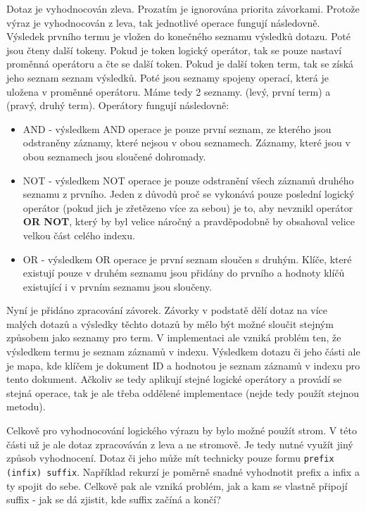 \documentclass[12pt, letterpaper]{article}
\begin{document}
Dotaz je vyhodnocován zleva. Prozatím je ignorována priorita závorkami. Protože výraz je vyhodnocován z leva, tak jednotlivé
operace fungují následovně. Výsledek prvního termu je vložen do konečného seznamu výsledků dotazu. Poté jsou čteny
další tokeny. Pokud je token logický operátor, tak se pouze nastaví proměnná operátoru a čte se další token. Pokud
je další token term, tak se získá jeho seznam seznam výsledků. Poté jsou seznamy spojeny operací, která je uložena
v  proměnné operátoru. Máme tedy 2 seznamy.  (levý, první term) a  (pravý, druhý term).
Operátory fungují následovně:
\begin{itemize}
    \item AND - výsledkem AND operace je pouze první seznam, ze kterého jsou odstraněny záznamy, které nejsou
        v obou seznamech. Záznamy, které jsou v obou seznamech jsou sloučené dohromady.
    \item NOT - výsledkem NOT operace je pouze odstranění všech záznamů druhého seznamu z prvního. Jeden z důvodů proč
        se vykonává pouze poslední logický operátor (pokud jich je zřetězeno více za sebou) je to, aby nevznikl operátor
        \textbf{OR NOT}, který by byl velice náročný a pravděpodobně by obsahoval velice velkou část celého indexu.
    \item OR - výsledkem OR operace je první seznam sloučen s druhým. Klíče, které existují pouze v druhém seznamu
        jsou přidány do prvního a hodnoty klíčů existující i v prvním seznamu jsou sloučeny.
\end{itemize}

Nyní je přidáno zpracování závorek. Závorky v podstatě dělí dotaz na více malých dotazů a výsledky těchto dotazů by mělo
být možné sloučit stejným způsobem jako seznamy pro term. V implementaci ale vzniká problém ten, že výsledkem
termu je seznam záznamů v indexu. Výsledkem dotazu či jeho části ale je mapa, kde klíčem je dokument ID a hodnotou je
seznam záznamů v indexu pro tento dokument. Ačkoliv se tedy aplikují stejné logické operátory a provádí se stejná
operace, tak je ale třeba oddělené implementace (nejde tedy použít stejnou metodu).

Celkově pro vyhodnocování logického výrazu by bylo možné použít strom. V této části už je ale dotaz zpracováván z leva
a ne stromově. Je tedy nutné využít jiný způsob vyhodnocení. Dotaz či jeho  může mít technicky pouze formu
\texttt{prefix (infix) suffix}. Například rekurzí je poměrně snadné vyhodnotit prefix a infix a ty spojit do sebe.
Celkově pak ale vzniká problém, jak a kam se vlastně připojí suffix - jak se dá zjistit, kde suffix začíná a končí?
\end{document}
